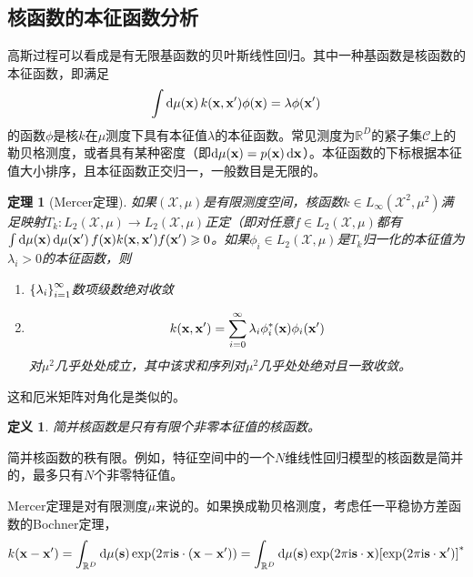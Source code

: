 \documentclass[12pt,UTF8]{article}
\newtheorem{theorem}{定理}[section]
\newtheorem{definition}{定义}[section]
\begin{document}
        \subsection{核函数的本征函数分析}
            高斯过程可以看成是有无限基函数的贝叶斯线性回归。其中一种基函数是核函数的本征函数，即满足
            \begin{equation}
                \int{\dd{\mu(\vb{x})}k(\vb{x},\vb{x}')\phi(\vb{x})}=\lambda\phi(\vb{x}')
            \end{equation}
            的函数$\phi$是核$k$在$\mu$测度下具有本征值$\lambda$的本征函数。常见测度为$\mathbb{R}^D$的紧子集$\mathcal{C}$上的勒贝格测度，或者具有某种密度（即$\dd{\mu(\vb{x})}=p(\vb{x})\dd{\vb{x}}$）。本征函数的下标根据本征值大小排序，且本征函数正交归一，一般数目是无限的。\par
            \begin{theorem}[Mercer定理]
                如果$(\mathcal{X},\mu)$是有限测度空间，核函数$k\in L_\infty(\mathcal{X}^2,\mu^2)$满足映射$T_k:L_2(\mathcal{X},\mu)\rightarrow L_2(\mathcal{X},\mu)$正定（即对任意$f\in L_2(\mathcal{X},\mu)$都有$\int{\dd{\mu(\vb{x})}\dd{\mu(\vb{x}')}f(\vb{x})k(\vb{x},\vb{x}')f(\vb{x}')}\geqslant 0$。如果$\phi_i\in L_2(\mathcal{X},\mu)$是$T_k$归一化的本征值为$\lambda_i>0$的本征函数，则
                \begin{enumerate}[label=\arabic*)]
                    \item $\qty{\lambda_i}_{i=1}^{\infty}$数项级数绝对收敛
                    \item \begin{equation}
                        k(\vb{x},\vb{x}')=\sum_{i=0}^{\infty}{\lambda_i\phi_i^*(\vb{x})\phi_i(\vb{x}')}
                    \end{equation}
                    对$\mu^2$几乎处处成立，其中该求和序列对$\mu^2$几乎处处绝对且一致收敛。
                \end{enumerate}
            \end{theorem}
            这和厄米矩阵对角化是类似的。\par
            \begin{definition}
                简并核函数是只有有限个非零本征值的核函数。
            \end{definition}
            简并核函数的秩有限。例如，特征空间中的一个$N$维线性回归模型的核函数是简并的，最多只有$N$个非零特征值。\par
            Mercer定理是对有限测度$\mu$来说的。如果换成勒贝格测度，考虑任一平稳协方差函数的Bochner定理，
            \begin{equation}
                k(\vb{x}-\vb{x}')=\int_{\mathbb{R}^D}{\dd{\mu(\vb{s})}\exp(2\pi\mathrm{i}\vb{s}\cdot(\vb{x}-\vb{x}'))}=\int_{\mathbb{R}^D}{\dd{\mu(\vb{s})}\exp(2\pi\mathrm{i}\vb{s}\cdot\vb{x})\qty[\exp(2\pi\mathrm{i}\vb{s}\cdot\vb{x}')]^*}
            \end{equation}
\end{document}
